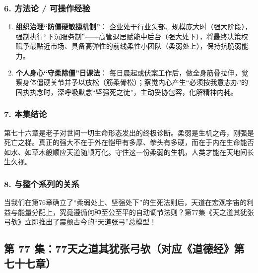 \subsubsection{6. 方法论 / 可操作经验}
\begin{enumerate}
    \item \textbf{组织治理“防僵硬敏捷机制”}：
    企业处于行业头部、规模庞大时（强大阶段），强制执行“下沉服务制”——高管退居赋能中后台（强大处下），将最终决策权赋予最贴近市场、具备高弹性的前线柔性小团队（柔弱处上），保持抗脆弱能力。
    \item \textbf{个人身心“守柔除僵”日课法}：
    每日晨起或伏案工作后，做全身筋骨拉伸，觉察身体僵硬关节并予以放松（筋柔骨松）；察觉内心产生“必须按我意志办”的固执执念时，深呼吸默念“坚强死之徒”，主动妥协包容，化解精神内耗。
\end{enumerate}

\subsubsection{7. 本集结论}
第七十六章是老子对世间一切生命形态发出的终极诊断。柔弱是生机之母，刚强是死亡之梯。真正的强大不在于外在铠甲有多厚、拳头有多硬，而在于内在生命能否如水、如草木般顺应天道随顺万化。守住这一份柔弱的生机，人类才能在天地间长生久视。

\subsubsection{8. 与整个系列的关系}
当我们在第76章确立了“柔弱处上、坚强处下”的生死法则后，天道在宏观宇宙的利益与能量分配上，究竟遵循何种至公至平的自动调节法则？第77集《天之道其犹张弓欤》立即推出了震颤古今的“天道张弓”总模型！

\clearpage

\subsection{第 77 集：77天之道其犹张弓欤（对应《道德经》第七十七章）}
\label{sec:ep77}

